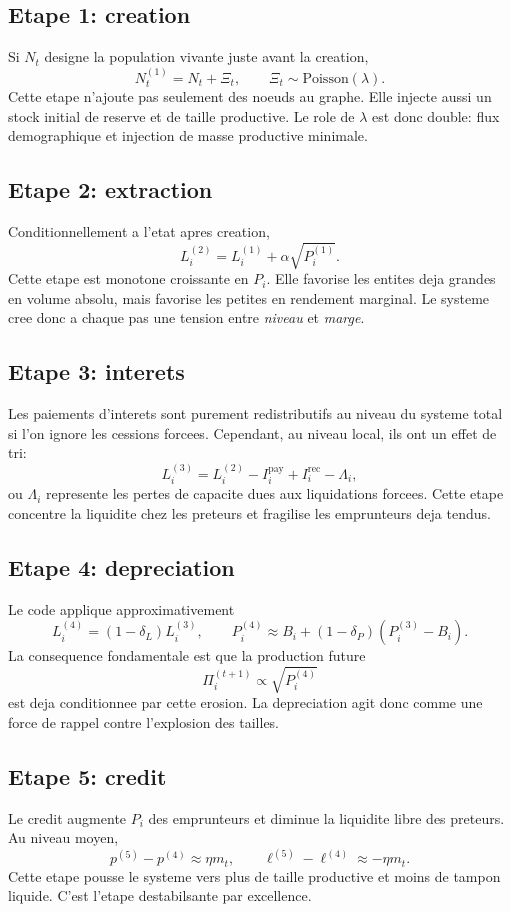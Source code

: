 \documentclass[11pt,a4paper]{article}
\begin{document}
\subsection{Etape 1: creation}
Si $N_t$ designe la population vivante juste avant la creation,
\[
N_t^{(1)} = N_t + \Xi_t,
\qquad
\Xi_t \sim \mathrm{Poisson}(\lambda).
\]
Cette etape n'ajoute pas seulement des noeuds au graphe. Elle injecte aussi un stock initial de reserve et de taille productive. Le role de $\lambda$ est donc double: flux demographique et injection de masse productive minimale.

\subsection{Etape 2: extraction}
Conditionnellement a l'etat apres creation,
\[
L_i^{(2)} = L_i^{(1)} + \alpha\sqrt{P_i^{(1)}}.
\]
Cette etape est monotone croissante en $P_i$. Elle favorise les entites deja grandes en volume absolu, mais favorise les petites en rendement marginal. Le systeme cree donc a chaque pas une tension entre \emph{niveau} et \emph{marge}.

\subsection{Etape 3: interets}
Les paiements d'interets sont purement redistributifs au niveau du systeme total si l'on ignore les cessions forcees. Cependant, au niveau local, ils ont un effet de tri:
\[
L_i^{(3)} = L_i^{(2)} - I_i^{\mathrm{pay}} + I_i^{\mathrm{rec}} - \Lambda_i,
\]
ou $\Lambda_i$ represente les pertes de capacite dues aux liquidations forcees. Cette etape concentre la liquidite chez les preteurs et fragilise les emprunteurs deja tendus.

\subsection{Etape 4: depreciation}
Le code applique approximativement
\[
L_i^{(4)}=(1-\delta_L)L_i^{(3)},
\qquad
P_i^{(4)} \approx B_i + (1-\delta_P)(P_i^{(3)}-B_i).
\]
La consequence fondamentale est que la production future
\[
\Pi_i^{(t+1)} \propto \sqrt{P_i^{(4)}}
\]
est deja conditionnee par cette erosion. La depreciation agit donc comme une force de rappel contre l'explosion des tailles.

\subsection{Etape 5: credit}
Le credit augmente $P_i$ des emprunteurs et diminue la liquidite libre des preteurs. Au niveau moyen,
\[
p^{(5)} - p^{(4)} \approx \eta m_t,
\qquad
\ell^{(5)} - \ell^{(4)} \approx -\eta m_t.
\]
Cette etape pousse le systeme vers plus de taille productive et moins de tampon liquide. C'est l'etape destabilsante par excellence.
\end{document}
